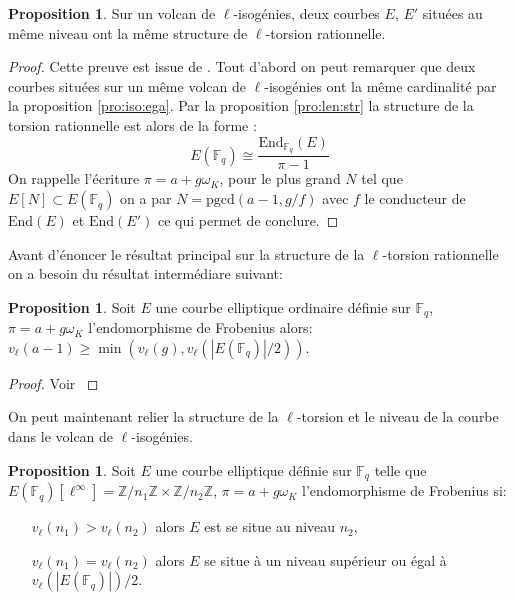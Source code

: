 \documentclass[10pt,a4paper]{book}
\theoremstyle{plain}
\theoremstyle{definition}
\theoremstyle{definition}
\theoremstyle{definition}
\newtheorem{prop}[thm]{Proposition}
\theoremstyle{definition}
\theoremstyle{remark}
\theoremstyle{remark}
\theoremstyle{definition}
\begin{document}
\begin{prop}
Sur un volcan de $\ell$-isogénies, deux courbes $E$, $E'$ situées au même niveau ont la même structure de $\ell$-torsion rationnelle.
\end{prop}

\begin{proof}
Cette preuve est issue de \cite{Ionica2010}.
Tout d'abord on peut remarquer que deux courbes situées sur un même volcan de $\ell$-isogénies ont la même cardinalité par la proposition \ref{pro:iso:ega}. Par la proposition \ref{pro:len:str} la structure de la torsion rationnelle est alors de la forme :
\[
E(\mathbb{F}_{q}) \cong \frac{\mathrm{End}_{\mathbb{F}_{q}}(E)}{\pi-1}
\] 
On rappelle l'écriture $\pi=a + g \omega_K$, pour le plus grand $N$ tel que $E[N] \subset E(\mathbb{F}_q)$ on a par \cite[Lemma 1]{Ruck1987} $N=\mathrm{pgcd}(a-1,g/f)$ avec $f$ le conducteur de $\mathrm{End}(E)$ et $\mathrm{End}(E')$ ce qui permet de conclure.
\end{proof}

Avant d'énoncer le résultat principal sur la structure de la $\ell$-torsion rationnelle on a besoin du résultat intermédiare suivant:

\begin{prop}
Soit $E$ une courbe elliptique ordinaire définie sur $\mathbb{F}_q$, $\pi=a+g \omega_K$ l'endomorphisme de Frobenius alors: $v_{\ell}(a-1) \geqslant \min(v_{\ell}(g),v_{\ell}(|E(\mathbb{F}_q)|/2))$.
\end{prop}

\begin{proof}
Voir \cite[Lemma 5.2]{Ionica2010}
\end{proof}

On peut maintenant relier la structure de la $\ell$-torsion et le niveau de la courbe dans le volcan de $\ell$-isogénies.

\begin{prop}
\label{pro:niv:str}
Soit $E$ une courbe elliptique définie sur $\mathbb{F}_q$ telle que $E(\mathbb{F}_q)[\ell^{\infty}]=\mathbb{Z}/n_1\mathbb{Z} \times \mathbb{Z}/n_2\mathbb{Z}$, $\pi = a + g \omega_K$ l'endomorphisme de Frobenius si:
\begin{itemize}
\item[$v_{\ell}(n_1)>v_{\ell}(n_2)$] alors $E$ est se situe au niveau $n_2$,
\item[$v_{\ell}(n_1)=v_{\ell}(n_2)$] alors $E$ se situe à un niveau supérieur ou égal à $v_{\ell}(|E(\mathbb{F}_q)|)/2$.
\end{itemize}
\end{prop}
\end{document}
